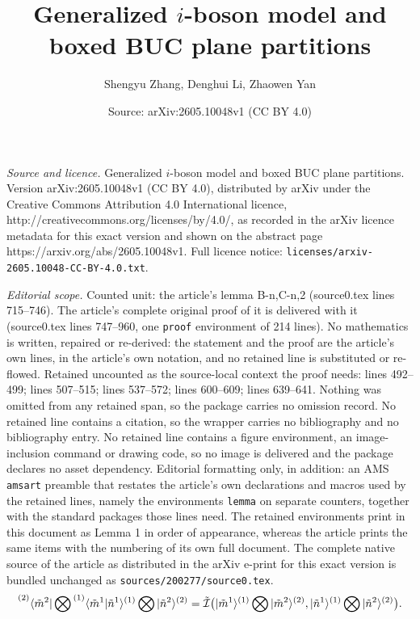 \documentclass[10pt,a4paper]{amsart}
\title{Generalized $i$-boson model and boxed BUC plane partitions}
\author{Shengyu Zhang, Denghui Li, Zhaowen Yan}
\date{Source: arXiv:2605.10048v1 (CC BY 4.0)}
\begin{document}
\maketitle

\noindent\emph{Source and licence.} Generalized $i$-boson model and boxed BUC plane partitions. Version arXiv:2605.10048v1 (CC BY 4.0), distributed by arXiv under the Creative Commons Attribution 4.0 International licence, http://creativecommons.org/licenses/by/4.0/, as recorded in the arXiv licence metadata for this exact version and shown on the abstract page https://arxiv.org/abs/2605.10048v1. Full licence notice: \texttt{licenses/arxiv-2605.10048-CC-BY-4.0.txt}.\par\smallskip

\noindent\textit{Editorial scope.} Counted unit: the article's lemma B-n,C-n,2 (source0.tex lines 715--746). The article's complete original proof of it is delivered with it (source0.tex lines 747--960, one \texttt{proof} environment of 214 lines). No mathematics is written, repaired or re-derived: the statement and the proof are the article's own lines, in the article's own notation, and no retained line is substituted or re-flowed.  Retained uncounted as the source-local context the proof needs: lines 492--499; lines 507--515; lines 537--572; lines 600--609; lines 639--641.  Nothing was omitted from any retained span, so the package carries no omission record.  No retained line contains a citation, so the wrapper carries no bibliography and no bibliography entry.  No retained line contains a figure environment, an image-inclusion command or drawing code, so no image is delivered and the package declares no asset dependency.  Editorial formatting only, in addition: an AMS \texttt{amsart} preamble that restates the article's own declarations and macros used by the retained lines, namely the environments \texttt{lemma} on separate counters, together with the standard packages those lines need.  The retained environments print in this document as Lemma 1 in order of appearance, whereas the article prints the same items with the numbering of its own full document.  The complete native source of the article as distributed in the arXiv e-print for this exact version is bundled unchanged as \texttt{sources/200277/source0.tex}.
	\begin{align}\label{tgibm-scalar-product}
		\prescript{(2)}{}{\langle \tilde{m}^{2}|}\bigotimes \prescript{(1)}{}{\langle \tilde{m}^{1}|}
		\tilde{n}^{1}\rangle^{(1)}\bigotimes|\tilde{n}^{2}\rangle^{(2)}
		=\tilde{\mathcal{I}}
		\big(
		|\tilde{m}^{1} \rangle^{(1)}\bigotimes|\tilde{m}^{2}\rangle^{(2)}, |\tilde{n}^{1}\rangle^{(1)}\bigotimes|\tilde{n}^{2}\rangle^{(2)}
		\big).
	\end{align}
\end{document}
